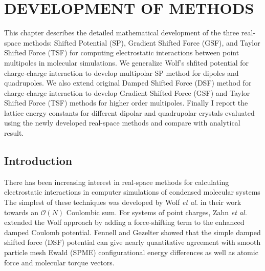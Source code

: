 %
%
%
%
%
%
%
%
%
%

%
%

\chapter{DEVELOPMENT OF METHODS}
\label{chap:development}
This chapter describes the detailed mathematical development of the three real-space methods: Shifted Potential (SP), Gradient Shifted Force (GSF), and Taylor Shifted Force (TSF) for computing electrostatic interactions between point multipoles in molecular simulations. We generalize Wolf's shfited potential for charge-charge interaction to develop multipolar SP method for dipoles and quadrupoles. We also extend original Damped Shifted Force (DSF) method for charge-charge interaction to develop Gradient Shifted Force (GSF) and Taylor Shifted Force (TSF) methods for higher order multipoles. Finally I report the lattice energy constants for different dipolar and quadrupolar crystals evaluated using the newly developed real-space methods and compare with analytical result.

\section{Introduction}
There has been increasing interest in real-space methods for
calculating electrostatic interactions in computer simulations of
condensed molecular systems \cite{Wolf99,Zahn02,Kast03,Beck05,Ma05,Gezelter06,Chen04,Chen06,Rodgers06,Denesyuk08,Izvekov08}
The simplest of these techniques was developed by Wolf {\it et al.}
in their work towards an $\mathcal{O}(N)$ Coulombic sum.\cite{Wolf99}
For systems of point charges, Zahn {\it et al.} extended the Wolf
approach by adding a force-shifting term to the enhanced damped
Coulomb potential.\cite{Zahn02,Kast03} Fennell and Gezelter showed
that the simple damped shifted force (DSF) potential can give nearly
quantitative agreement with smooth particle mesh Ewald
(SPME)\cite{Essmann95} configurational energy differences as well as
atomic force and molecular torque vectors.\cite{Gezelter06}

